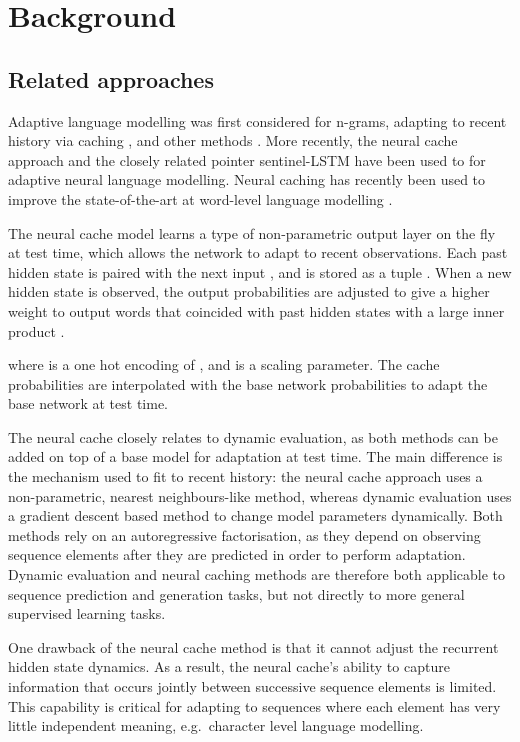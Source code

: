 \documentclass{article} \usepackage{iclr2018_conference,times}
\begin{document}
\section{Background}

\subsection{Related approaches}

Adaptive language modelling was first considered for n-grams, adapting to recent history via caching \citep{jelinek1991,kuhn1988}, and other methods \citet{bellegarda2004adaptation}. More recently, the neural cache approach \citep{grave2017} and the closely related pointer sentinel-LSTM \citep{Merity2016} have been used to for adaptive neural language modelling. Neural caching has recently been used to improve the state-of-the-art at word-level language modelling \citep{merity2017}.

The neural cache model learns a type of non-parametric output layer on the fly at test time, which allows the network to adapt to recent observations. Each past hidden state  is paired with the next input , and is stored as a tuple . When a new hidden state  is observed, the output probabilities are adjusted to give a higher weight to output words that coincided with past hidden states with a large inner product . 

where  is a one hot encoding of , and  is a scaling parameter. The cache probabilities are interpolated with the base network probabilities to adapt the base network at test time.

The neural cache closely relates to dynamic evaluation, as both methods can be added on top of a base model for adaptation at test time. The main difference is the mechanism used to fit to recent history: the neural cache approach uses a non-parametric, nearest neighbours-like method, whereas dynamic evaluation uses a gradient descent based method to change model parameters dynamically. Both methods rely on an autoregressive factorisation, as they depend on observing sequence elements after they are predicted in order to perform adaptation. Dynamic evaluation and neural caching methods are therefore both applicable to sequence prediction and generation tasks, but not directly to more general supervised learning tasks.


One drawback of the neural cache method is that it cannot adjust the recurrent hidden state dynamics. As a result, the neural cache's ability to capture information that occurs jointly between successive sequence elements is limited. This capability is critical for adapting to sequences where each element has very little independent meaning, e.g.\ character level language modelling. 
\end{document}
